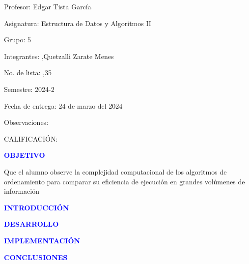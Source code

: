 \documentclass[12pt]{article}
\newcommand{\Profesor}{Profesor: Edgar Tista García}
\newcommand{\Materia}{Asignatura: Estructura de Datos y Algoritmos II}
\newcommand{\Grupo}{Grupo:  5}
\newcommand{\Nombre}{Integrantes:   ,Quetzalli Zarate Menes}
\newcommand{\NoLista}{No. de lista:     ,35}
\newcommand{\Semestre}{Semestre: 2024-2}
\newcommand{\Fecha}{Fecha de entrega: 24 de marzo del 2024}
\newcommand{\Observaciones}{Observaciones:}
\newcommand{\Calificacion}{CALIFICACIÓN:}
\begin{document}
    
    \Large{\Profesor}\par\vspace{0.6cm}
    \Large{\Materia}\par\vspace{0.6cm}
    \Large{\Grupo}\par\vspace{0.6cm}
    \Large{\Nombre}\par\vspace{0.6cm}
    \Large{\NoLista}\par\vspace{0.6cm}
    \Large{\Semestre}\par\vspace{0.6cm}
    \Large{\Fecha}\par\vspace{0.6cm}
    \Large{\Observaciones}\par\vspace{0.6cm}

    \begin{center}
        \Large{\Calificacion}\par\vspace{0.6cm}
    \end{center}
    
    \newpage
    \textcolor{blue}{\textbf{OBJETIVO}}
    \par\vspace{0.4cm}
    Que el alumno observe la complejidad computacional de los algoritmos de ordenamiento para 
comparar su eficiencia de ejecución en grandes volúmenes de información


    \par\vspace{1.5cm}

    \textcolor{blue}{\textbf{INTRODUCCIÓN}}

    \textcolor{blue}{\textbf{DESARROLLO}}

    \textcolor{blue}{\textbf{IMPLEMENTACIÓN}}





    \textcolor{blue}{\textbf{CONCLUSIONES}}
























    
\end{document}
